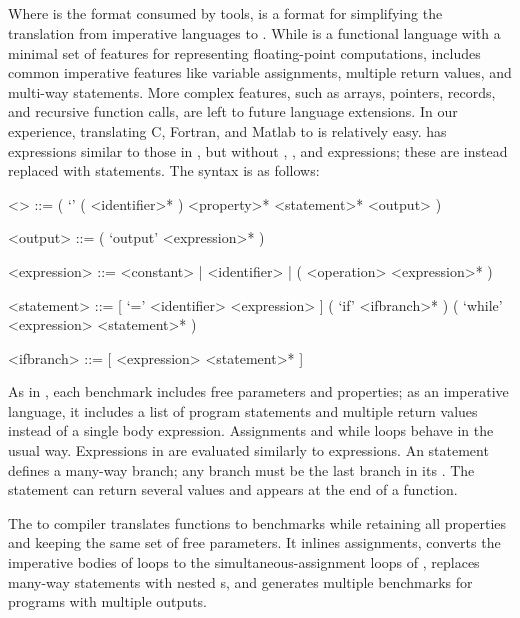 \documentclass[main.tex]{subfiles}
\begin{document}
\subsection{\surface}

Where \core is the format consumed by tools,
  \surface is a format for simplifying the translation
  from imperative languages to \core.
While \core is a functional language
  with a minimal set of features
  for representing floating-point computations,
  \surface includes common imperative features
  like variable assignments,
  multiple return values,
  and multi-way  statements.
More complex features,
  such as arrays, pointers, records, and recursive function calls,
  are left to future language extensions.
In our experience,
  translating C, Fortran, and Matlab to \surface is relatively easy.
\surface has expressions similar to those in \core,
  but without , , and  expressions;
  these are instead replaced with statements.
The \surface syntax is as follows:

\begin{grammar}
<\surface> ::= ( `\surface' ( <identifier>* ) <property>* <statement>* <output> )

<output> ::= ( `output' <expression>* )

<expression> ::= <constant> | <identifier> | ( <operation> <expression>* )

<statement> ::= [ `=' <identifier> <expression> ]
\alt ( `if' <ifbranch>* )
\alt ( `while' <expression> <statement>* )

<ifbranch> ::= [ <expression> <statement>* ]
\end{grammar}

As in \core, each \surface benchmark
  includes free parameters and properties;
  as an imperative language,
  it includes a list of program statements
  and multiple return values
  instead of a single body expression.
Assignments and while loops behave in the usual way.
Expressions in \surface are evaluated similarly to \core expressions.
An  statement defines a many-way branch;
  any  branch must be the last branch in its .
The  statement can return several values and appears
  at the end of a function.

The \surface to \core compiler
  translates \surface functions to \core benchmarks
  while retaining all properties and keeping the same set of free parameters.
It inlines assignments, converts the imperative bodies of \surface loops
  to the simultaneous-assignment loops of \core,
  replaces many-way  statements with nested s,
  and generates multiple \core benchmarks for \surface programs with
  multiple outputs.
\end{document}
